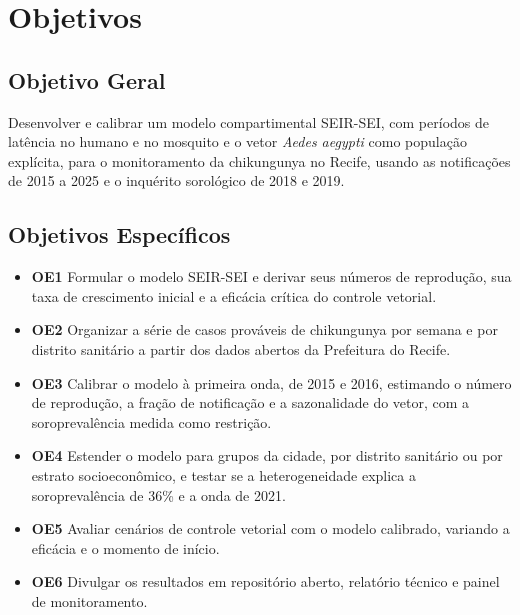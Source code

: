 \section{Objetivos}
\label{sec:objetivos}

\subsection{Objetivo Geral}

Desenvolver e calibrar um modelo compartimental SEIR-SEI, com períodos de latência no humano e no mosquito
e o vetor \textit{Aedes aegypti} como população explícita, para o monitoramento da chikungunya no Recife, usando as
notificações de 2015 a 2025 e o inquérito sorológico de 2018 e 2019.

\subsection{Objetivos Específicos}

\begin{itemize}
  \item \textbf{OE1} Formular o modelo SEIR-SEI e derivar seus números de reprodução, sua taxa de
  crescimento inicial e a eficácia crítica do controle vetorial.
  \item \textbf{OE2} Organizar a série de casos prováveis de chikungunya por semana e por distrito sanitário
  a partir dos dados abertos da Prefeitura do Recife.
  \item \textbf{OE3} Calibrar o modelo à primeira onda, de 2015 e 2016, estimando o número de reprodução, a
  fração de notificação e a sazonalidade do vetor, com a soroprevalência medida como restrição.
  \item \textbf{OE4} Estender o modelo para grupos da cidade, por distrito sanitário ou por estrato
  socioeconômico, e testar se a heterogeneidade explica a soroprevalência de 36\% e a onda de 2021.
  \item \textbf{OE5} Avaliar cenários de controle vetorial com o modelo calibrado, variando a eficácia e o
  momento de início.
  \item \textbf{OE6} Divulgar os resultados em repositório aberto, relatório técnico e painel de
  monitoramento.
\end{itemize}
